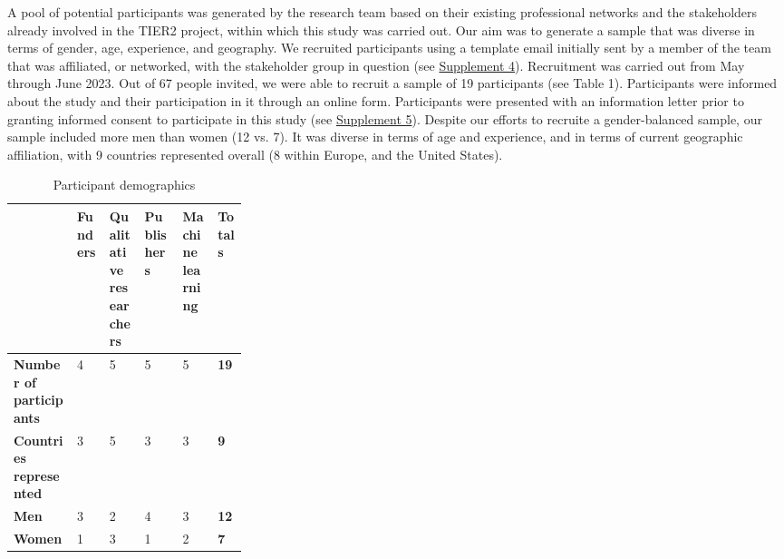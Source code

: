 \documentclass[authordate, meta]{jote-new-article}
\begin{document}
	A pool of potential participants was generated by the research team based on their existing professional networks and the stakeholders already involved in the TIER2 project, within which this study was carried out. Our aim was to generate a sample that was diverse in terms of gender, age, experience, and geography. We recruited participants using a template email initially sent by a member of the team that was affiliated, or networked, with the stakeholder group in question (see \href{https://osf.io/n28sg/files/gbrh6}{Supplement 4}). Recruitment was carried out from May through June 2023. Out of 67 people invited, we were able to recruit a sample of 19 participants (see Table 1). Participants were informed about the study and their participation in it through an online form. Participants were presented with an information letter prior to granting informed consent to participate in this study (see \href{https://osf.io/n28sg/files/rxj2t}{Supplement 5}). Despite our efforts to recruite a gender-balanced sample, our sample included more men than women (12 vs. 7). It was diverse in terms of age and experience, and in terms of current geographic affiliation, with 9 countries represented overall (8 within Europe, and the United States).



	\begin{table}
		\begin{tabular}{@{} l l p{0.15\linewidth} l p{0.15\linewidth} l @{}}
			\hline  & \textbf{Funders} & \textbf{Qualitative \newline researchers} &
			\textbf{Publishers} & \textbf{Machine \newline learning} & \textbf{Totals} \\

			\hline \textbf{Number of participants} & 4 & 5 & 5 & 5 & \textbf{19} \\

			\hline \textbf{Countries represented} & 3 & 5 & 3 & 3 & \textbf{9} \\

			\hline \textbf{Men} & 3 & 2 & 4 & 3 & \textbf{12} \\

			\hline \textbf{Women} & 1 & 3 & 1 & 2 & \textbf{7} \\


		\end{tabular}
		\caption{Participant demographics}
	\end{table}
\end{document}
